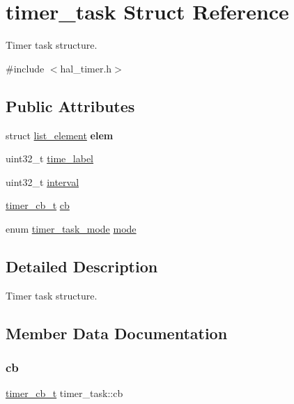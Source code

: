 \hypertarget{structtimer__task}{}\section{timer\+\_\+task Struct Reference}
\label{structtimer__task}


Timer task structure.  




{\ttfamily \#include $<$hal\+\_\+timer.\+h$>$}

\subsection*{Public Attributes}
\begin{DoxyCompactItemize}
\item 
\mbox{\label{structtimer__task_a79f338a842e6edd81f9273a18c3877f7}} 
struct \hyperlink{structlist__element}{list\+\_\+element} {\bfseries elem}
\item 
uint32\+\_\+t \hyperlink{structtimer__task_a862d2aad8a2d1a9c22d108227cbf6c24}{time\+\_\+label}
\item 
uint32\+\_\+t \hyperlink{structtimer__task_a627f11cf534c7c4173e010235a3545ce}{interval}
\item 
\hyperlink{group__doc__driver__hal__timer_ga636b5fdfa1fc11dcedfc831f36bec204}{timer\+\_\+cb\+\_\+t} \hyperlink{structtimer__task_a74a6d0c7868a22666966e37b32795d25}{cb}
\item 
enum \hyperlink{group__doc__driver__hal__timer_gaca1571cb764dfc6dc97aca691789d53d}{timer\+\_\+task\+\_\+mode} \hyperlink{structtimer__task_afaa093b08fe0267ae9b66b016b0886e0}{mode}
\end{DoxyCompactItemize}


\subsection{Detailed Description}
Timer task structure. 

\subsection{Member Data Documentation}
\mbox{\label{structtimer__task_a74a6d0c7868a22666966e37b32795d25}} 
\subsubsection{\texorpdfstring{cb}{cb}}
{\footnotesize\ttfamily \hyperlink{group__doc__driver__hal__timer_ga636b5fdfa1fc11dcedfc831f36bec204}{timer\+\_\+cb\+\_\+t} timer\+\_\+task\+::cb}

